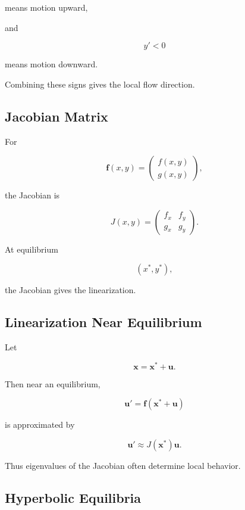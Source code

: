 means motion upward,

and

\[
y'<0
\]

means motion downward.

Combining these signs gives the local flow direction.

\subsection{Jacobian Matrix}
\label{subsec:dynamical-jacobian}

For

\[
\mathbf{f}(x,y)
=
\begin{pmatrix}
f(x,y)\\
g(x,y)
\end{pmatrix},
\]

the Jacobian is

\[
\boxed{
J(x,y)
=
\begin{pmatrix}
f_x&f_y\\
g_x&g_y
\end{pmatrix}.
}
\]

At equilibrium

\[
(x^*,y^*),
\]

the Jacobian gives the linearization.

\subsection{Linearization Near Equilibrium}
\label{subsec:dynamical-linearization}

Let

\[
\mathbf{x}
=
\mathbf{x}^*
+
\mathbf{u}.
\]

Then near an equilibrium,

\[
\mathbf{u}'
=
\mathbf{f}
(
\mathbf{x}^*+\mathbf{u}
)
\]

is approximated by

\[
\boxed{
\mathbf{u}'
\approx
J(\mathbf{x}^*)
\mathbf{u}.
}
\]

Thus eigenvalues of the Jacobian often determine local behavior.

\subsection{Hyperbolic Equilibria}
\label{subsec:dynamical-hyperbolic-equilibria}

